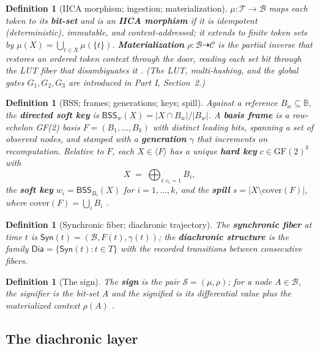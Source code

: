 \documentclass[11pt,a4paper]{article}
\newtheorem{definition}[principle]{Definition}
\theoremstyle{remark}
\newcommand{\Plane}{\ensuremath{\mathbb{B}}}            %
\newcommand{\Lat}{\ensuremath{\mathcal{B}}}              %
\newcommand{\Tok}{\ensuremath{\mathcal{T}}}              %
\newcommand{\BSS}{\ensuremath{\mathsf{BSS}}}             %
\newcommand{\spanof}[1]{\ensuremath{\langle #1\rangle}}  %
\newcommand{\Ctx}{\ensuremath{\mathcal{C}}}              %
\newcommand{\Ing}{\ensuremath{\mu}}                      %
\newcommand{\Mat}{\ensuremath{\rho}}                     %
\newcommand{\Sign}{\ensuremath{\mathcal{S}}}             %
\newcommand{\Sync}{\ensuremath{\mathsf{Syn}}}            %
\newcommand{\Dia}{\ensuremath{\mathsf{Dia}}}             %
\newcommand{\Gen}{\ensuremath{\gamma}}                   %
\newcommand{\cover}{\ensuremath{\mathrm{cover}}}         %
\begin{document}
\begin{definition}[IICA morphism; ingestion; materialization]
\label{def:iica}
$\Ing : \Tok \to \Lat$ maps each token to its \textbf{bit-set} and is an
\textbf{IICA morphism} if it is idempotent
(deterministic), immutable, and content-addressed; it extends to finite token
sets by $\Ing(X)=\bigcup_{t\in X}\Ing(\{t\})$. \textbf{Materialization}
$\Mat : \Lat \dashrightarrow \Ctx$ is the partial inverse that restores an
ordered token context through the door, reading each set bit through the LUT
fiber that disambiguates it \cite{attention2026}. (The LUT, multi-hashing,
and the global gates $G_1,G_2,G_3$ are introduced in Part I, Section~2.)
\end{definition}

\begin{definition}[BSS; frames; generations; keys; spill]
\label{def:frame}
Against a reference $B_w \subseteq \Plane$, the \textbf{directed soft key} is
$\BSS_w(X) = |X \cap B_w| / |B_w|$. A \textbf{basis frame} is a row-echelon
GF(2) basis $F=(B_1,\dots,B_k)$ with distinct leading bits, spanning a set of
observed nodes, and stamped with a \textbf{generation} $\Gen$ that increments
on recomputation. Relative to $F$, each $X \in \spanof{F}$ has a unique
\textbf{hard key} $c \in \mathrm{GF}(2)^k$ with
\[
  X \;=\; \bigoplus_{i : c_i = 1} B_i,
\]
the \textbf{soft key} $w_i = \BSS_{B_i}(X)$ for $i=1,\dots,k$, and the
\textbf{spill} $s = |X \setminus \cover(F)|$, where
$\cover(F) = \bigcup_i B_i$ \cite{state2026}.
\end{definition}

\begin{definition}[Synchronic fiber; diachronic trajectory]
\label{def:syn-dia}
The \textbf{synchronic fiber} at time $t$ is $\Sync(t) = (\Lat, F(t),
\Gen(t))$; the \textbf{diachronic structure} is the family $\Dia = \{\Sync(t)
: t \in T\}$ with the recorded transitions between consecutive fibers.
\end{definition}

\begin{definition}[The sign]
\label{def:sign}
The \textbf{sign} is the pair $\Sign = (\Ing,\Mat)$; for a node $A \in \Lat$,
the signifier is the bit-set $A$ and the signified is its differential value
plus the materialized context $\Mat(A)$ \cite{part1,part2}.
\end{definition}

\subsection{The diachronic layer}
\end{document}
